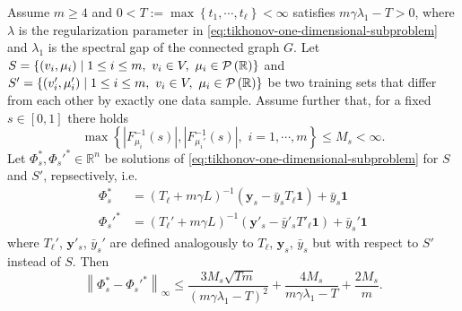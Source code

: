\documentclass[letterpaper]{article} %
\begin{document}
\begin{theorem}
  \label{thm:slice-algorithmic-stability}
  Assume $m\geq 4$ and $0<T:=\max \left\{ t_1,\cdots,t_{\ell} \right\}<\infty$ satisfies $m\gamma\lambda_1-T>0$, where $\lambda$ is the regularization parameter in \eqref{eq:tikhonov-one-dimensional-subproblem} and $\lambda_1$ is the spectral gap of the connected graph $G$. Let $S=\left\{ \left( v_i,\mu_i \right)\mid 1\leq i\leq m,\,\,v_i\in V,\,\,\mu_i\in\P\left( \mathbb{R} \right) \right\}$ and $S'=\left\{ \left( v'_i,\mu'_i \right)\mid 1\leq i\leq m,\,\,v_i\in V,\,\,\mu_i\in\P\left( \mathbb{R} \right) \right\}$ be two training sets that differ from each other by exactly one data sample. Assume further that, for a fixed $s\in \left[ 0,1 \right]$ there holds
  \begin{equation}
    \label{eq:quantile-boundedness}
    \max \left\{ \left|F_{\mu_i}^{-1} \left( s \right)\right|, \left|F_{\mu_i'}^{-1} \left( s \right)\right|,\,\,i=1,\cdots,m\right\}\leq M_s<\infty.
  \end{equation}
  Let $\Phi_s^{*},\Phi_s'^{*}\in\mathbb{R}^n$ be solutions of \eqref{eq:tikhonov-one-dimensional-subproblem} for $S$ and $S'$, repsectively, i.e.
  \begin{equation*}
    \begin{aligned}
      \Phi_s^{*}&=\left( T_{\ell}+m\gamma L \right)^{-1}\left(\mathbf{y}_s-\bar{y}_sT_\ell\mathbf{1}\right)+\bar{y}_s\mathbf{1}\\
      \Phi_s'^{*}&=\left( T_{\ell}'+m\gamma L \right)^{-1}\left(\mathbf{y}'_s-\bar{y}'_sT'_\ell\mathbf{1}\right)+\bar{y}_s'\mathbf{1}
    \end{aligned}
  \end{equation*}
  where $T_{\ell}'$, $\mathbf{y}'_s$, $\bar{y}_s'$ are defined analogously to $T_{\ell}$, $\mathbf{y}_s$, $\bar{y}_s$ but with respect to $S'$ instead of $S$. Then
  \begin{equation}
    \label{eq:slice-algorithmic-stability}
    \left\| \Phi_s^{*} -\Phi_s'^{*} \right\|_{\infty} \leq \frac{3M_s\sqrt{Tm}}{\left( m\gamma\lambda_1-T \right)^2}+\frac{4M_s}{m\gamma\lambda_1-T}+\frac{2M_s}{m}.
  \end{equation}
\end{theorem}
\end{document}
